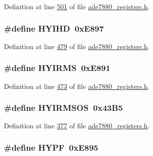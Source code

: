 Definition at line \hyperlink{a00036_source_l00501}{501} of file \hyperlink{a00036_source}{ade7880\-\_\-registers.\-h}.

\hypertarget{a00036_ab72d02266f5b5d71c904dad3a46d11f2}{
\subsubsection[{H\-Y\-I\-H\-D}]{\setlength{\rightskip}{0pt plus 5cm}\#define H\-Y\-I\-H\-D~0x\-E897}}\label{de/d8c/a00036_ab72d02266f5b5d71c904dad3a46d11f2}


Definition at line \hyperlink{a00036_source_l00479}{479} of file \hyperlink{a00036_source}{ade7880\-\_\-registers.\-h}.

\hypertarget{a00036_a106c8c6a9eecb98d5120f148a5996b3b}{
\subsubsection[{H\-Y\-I\-R\-M\-S}]{\setlength{\rightskip}{0pt plus 5cm}\#define H\-Y\-I\-R\-M\-S~0x\-E891}}\label{de/d8c/a00036_a106c8c6a9eecb98d5120f148a5996b3b}


Definition at line \hyperlink{a00036_source_l00473}{473} of file \hyperlink{a00036_source}{ade7880\-\_\-registers.\-h}.

\hypertarget{a00036_aac521643712ebedb26c099dd281c7d73}{
\subsubsection[{H\-Y\-I\-R\-M\-S\-O\-S}]{\setlength{\rightskip}{0pt plus 5cm}\#define H\-Y\-I\-R\-M\-S\-O\-S~0x43\-B5}}\label{de/d8c/a00036_aac521643712ebedb26c099dd281c7d73}


Definition at line \hyperlink{a00036_source_l00377}{377} of file \hyperlink{a00036_source}{ade7880\-\_\-registers.\-h}.

\hypertarget{a00036_a568414006677cee317dbecd162a95858}{
\subsubsection[{H\-Y\-P\-F}]{\setlength{\rightskip}{0pt plus 5cm}\#define H\-Y\-P\-F~0x\-E895}}\label{de/d8c/a00036_a568414006677cee317dbecd162a95858}


